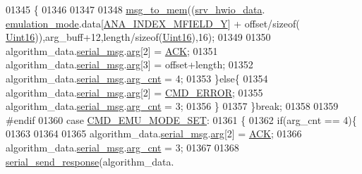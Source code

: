 \begin{DoxyCode}
{{{{{01345                       \{
01346 
01347 
01348                        \hyperlink{a00038_a126f3d78a95341a19a3e862e57357952}{msg\_to\_mem}((\hyperlink{a00034_a0fd91014631926f362c7c2b2f5d143b0}{srv\_hwio\_data}.
      \hyperlink{a00034_a742dceaef1f19ec73ed5acc066127476}{emulation\_mode}.data[\hyperlink{a00058_aa2f14d4d069c5888b1d230be59751a09}{ANA\_INDEX\_MFIELD\_Y}] + offset/\textcolor{keyword}{sizeof}(
      \hyperlink{a00072_a59a9f6be4562c327cbfb4f7e8e18f08b}{Uint16})),arg\_buff+12,length/\textcolor{keyword}{sizeof}(\hyperlink{a00072_a59a9f6be4562c327cbfb4f7e8e18f08b}{Uint16}),16);
01349 
01350                          algorithm\_data.\hyperlink{a00016_afcf5f557aea688aad985eec15269c1da}{serial\_msg}.\hyperlink{a00031_af7d6f762438c80072bd9dc0e4dd4ae1e}{arg}[2]  = \hyperlink{a00021_a6f6489887e08bff4887d0bc5dcf214d8}{ACK};
01351                          algorithm\_data.\hyperlink{a00016_afcf5f557aea688aad985eec15269c1da}{serial\_msg}.\hyperlink{a00031_af7d6f762438c80072bd9dc0e4dd4ae1e}{arg}[3]  = offset+length;
01352                          algorithm\_data.\hyperlink{a00016_afcf5f557aea688aad985eec15269c1da}{serial\_msg}.\hyperlink{a00031_a7b79f40e2eeec288091afd340bf8f591}{arg\_cnt} = 4;
01353                      \}\textcolor{keywordflow}{else}\{
01354                          algorithm\_data.\hyperlink{a00016_afcf5f557aea688aad985eec15269c1da}{serial\_msg}.\hyperlink{a00031_af7d6f762438c80072bd9dc0e4dd4ae1e}{arg}[2] = 
      \hyperlink{a00021_a1764a522e9c1a59a59be8757c69fa494}{CMD\_ERROR};
01355                          algorithm\_data.\hyperlink{a00016_afcf5f557aea688aad985eec15269c1da}{serial\_msg}.\hyperlink{a00031_a7b79f40e2eeec288091afd340bf8f591}{arg\_cnt} = 3;
01356                      \}
01357                 \}\textcolor{keywordflow}{break};
01358 
01359 \textcolor{preprocessor}{#endif}
01360                  \textcolor{keywordflow}{case}  \hyperlink{a00021_ac80fdfdbada05f61256bef39c2064330}{CMD\_EMU\_MODE\_SET}:
01361                 \{
01362                         \textcolor{keywordflow}{if}(arg\_cnt == 4)\{
01363                             
01364                         
01365                         algorithm\_data.\hyperlink{a00016_afcf5f557aea688aad985eec15269c1da}{serial\_msg}.\hyperlink{a00031_af7d6f762438c80072bd9dc0e4dd4ae1e}{arg}[2]    = \hyperlink{a00021_a6f6489887e08bff4887d0bc5dcf214d8}{ACK};
01366                         algorithm\_data.\hyperlink{a00016_afcf5f557aea688aad985eec15269c1da}{serial\_msg}.\hyperlink{a00031_a7b79f40e2eeec288091afd340bf8f591}{arg\_cnt}   = 3;
01367 
01368                          \hyperlink{a00031_a96a3f016ca5b0736424c2695fe9fbdf8}{serial\_send\_response}(algorithm\_data.
}}}}}
\end{DoxyCode}
